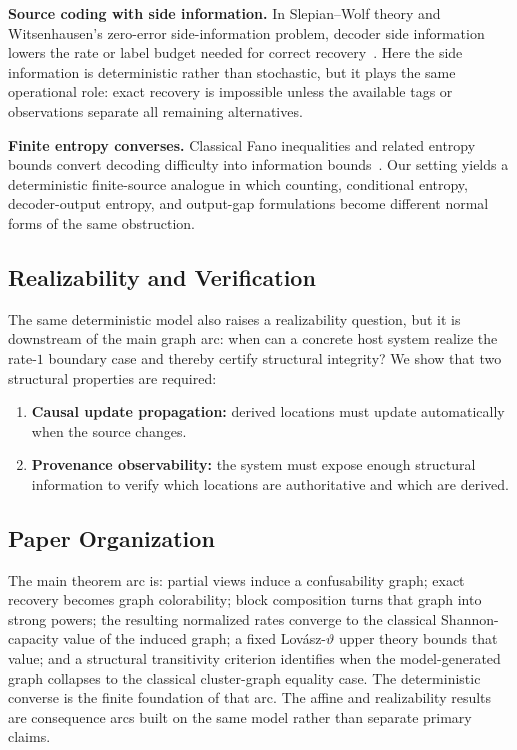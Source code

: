 \textbf{Source coding with side information.} In Slepian--Wolf theory and Witsenhausen's zero-error side-information problem, decoder side information lowers the rate or label budget needed for correct recovery~\cite{slepian1973noiseless,witsenhausen1976zero}. Here the side information is deterministic rather than stochastic, but it plays the same operational role: exact recovery is impossible unless the available tags or observations separate all remaining alternatives.

\textbf{Finite entropy converses.} Classical Fano inequalities and related entropy bounds convert decoding difficulty into information bounds~\cite{fano1961transmission,witsenhausen1975conditional,cover2006elements}. Our setting yields a deterministic finite-source analogue in which counting, conditional entropy, decoder-output entropy, and output-gap formulations become different normal forms of the same obstruction.

\subsection{Realizability and Verification}\label{sec:realizability}

The same deterministic model also raises a realizability question, but it is downstream of the main graph arc: when can a concrete host system realize the rate-$1$ boundary case and thereby certify structural integrity? We show that two structural properties are required:
\begin{enumerate}
\item \textbf{Causal update propagation:} derived locations must update automatically when the source changes.
\item \textbf{Provenance observability:} the system must expose enough structural information to verify which locations are authoritative and which are derived.
\end{enumerate}

\subsection{Paper Organization}\label{overview}

The main theorem arc is: partial views induce a confusability graph; exact recovery becomes graph colorability; block composition turns that graph into strong powers; the resulting normalized rates converge to the classical Shannon-capacity value of the induced graph; a fixed Lov\'asz-$\vartheta$ upper theory bounds that value; and a structural transitivity criterion identifies when the model-generated graph collapses to the classical cluster-graph equality case. The deterministic converse is the finite foundation of that arc. The affine and realizability results are consequence arcs built on the same model rather than separate primary claims.

